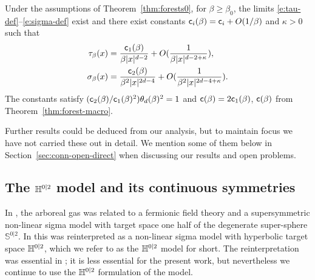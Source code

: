 \documentclass[11pt]{amsart}
\numberwithin{equation}{section}
\numberwithin{theorem}{section}
\newcommand{\1}{{\bf 1}}
\newcommand{\consta}{{\sf c}_1}
\newcommand{\constb}{{\sf c}_2}
\newcommand{\consto}{{\sf c}}
\begin{document}
\begin{theorem} \label{thm:forests}
  Under the assumptions of Theorem~\ref{thm:forests0}, for $\beta\geq \beta_0$,
  the limits \eqref{e:tau-def}--\eqref{e:sigma-def} exist and there exist
  constants ${\sf c}_i(\beta) = {\sf c}_i+O(1/\beta)$ and $\kappa>0$ such that
  \begin{align}
    \label{e:thm-forest-tau}
    \tau_{\beta}(x) &= \frac{\consta(\beta)}{\beta|x|^{d-2}} +
                      O(\frac{1}{\beta |x|^{d-2+\kappa}}), 
    \\
    \label{e:thm-forest-sigma}
    \sigma_{\beta}(x) &= \frac{\constb(\beta)}{\beta^2|x|^{2d-4}} + O(\frac{1}{\beta^2 |x|^{2d-4+\kappa}}).
  \end{align}
  The constants satisfy
  $(\constb(\beta)/\consta(\beta)^2)\theta_d(\beta)^2=1$  and
  $\consto(\beta) = 2\consta(\beta)$, $\consto(\beta)$ from
  Theorem~\ref{thm:forest-macro}.
\end{theorem}

Further results could be deduced from our analysis, but to maintain
focus we have not carried these out in detail.  We mention some of
them below in Section~\ref{sec:conn-open-direct} when discussing our
results and open problems.

\subsection{The $\mathbb{H}^{0|2}$  model and its continuous symmetries}
\label{sec:spinintro}

In \cite{MR2110547,MR3622573}, the arboreal gas was related to a
fermionic field theory and a supersymmetric non-linear sigma model
with target space one half of the degenerate super-sphere
$\mathbb S^{0|2}$. In \cite{MR4218682} this was
reinterpreted as a non-linear sigma model with hyperbolic target space
$\mathbb{H}^{0|2}$, which we refer to as the $\mathbb{H}^{0|2}$
model for short.   The reinterpretation was essential in
\cite{MR4218682}; it is less essential for the present work, but
nevertheless we continue to use the $\mathbb{H}^{0|2}$ formulation of the model.  
\end{document}
